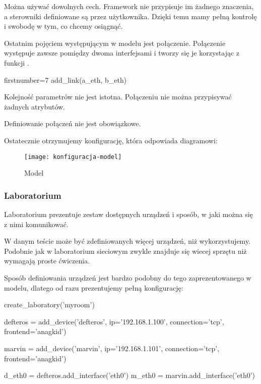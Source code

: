 \documentclass[00-praca-magisterska.tex]{subfiles}
\begin{document}
Można używać dowolnych cech. Framework nie przypisuje im żadnego znaczenia, a
sterowniki definiowane są przez użytkownika. Dzięki temu mamy pełną kontrolę i
swobodę w tym, co chcemy osiągnąć.

Ostatnim pojęciem występującym w modelu jest połączenie. Połączenie występuje
zawsze pomiędzy dwoma interfejsami i tworzy się je korzystając z funkcji
.

\begin{pythoncode*}{firstnumber=7}
  add_link(a_eth, b_eth)
\end{pythoncode*}

Kolejność parametrów nie jest istotna. Połączeniu nie można przypisywać
żadnych atrybutów.


Definiowanie połączeń nie jest obowiązkowe.

Ostatecznie otrzymujemy konfigurację, która odpowiada diagramowi:

\begin{figure}[htb]
\begin{center}
\leavevmode
\texttt{[image: konfiguracja-model]}
\end{center}
\caption{Model}
\label{fig:konfiguracja-model}
\end{figure}

\subsubsection{Laboratorium}

Laboratorium prezentuje zestaw dostępnych urządzeń i sposób, w jaki można się
z nimi komunikować.

W danym teście może być zdefiniowanych więcej urządzeń, niż wykorzystujemy.
Podobnie jak w laboratorium sieciowym zwykle znajduje się wiecej sprzętu niż
wymagają proste ćwiczenia.

Sposób definiowania urządzeń jest bardzo podobny do tego zaprezentowanego w
modelu, dlatego od razu prezentujemy pełną konfigurację:

\begin{pythoncode}
  create_laboratory('myroom')

  defteros = add_device('defteros',
      ip='192.168.1.100',
      connection='tcp',
      frontend='anagkid')

  marvin = add_device('marvin',
      ip='192.168.1.101',
      connection='tcp',
      frontend='anagkid')

  d_eth0 = defteros.add_interface('eth0')
  m_eth0 = marvin.add_interface('eth0')
\end{pythoncode}
\end{document}
